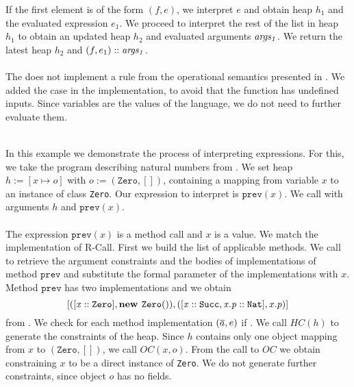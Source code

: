 If the first element is of the form $(f, e)$,
we interpret $e$ and obtain heap $h_1$ and the evaluated expression $e_1$.
We proceed to interpret the rest of the list in heap $h_1$
to obtain an updated heap $h_2$ and evaluated arguments $\mathit{args_1}$.
We return the latest heap $h_2$ and $(f, e_1) :: \mathit{args_1}$.\\
\\
The  does not implement
a rule from the operational semantics presented in .
We added the case in the implementation,
to avoid that the function has undefined inputs.
Since variables are the values of the language,
we do not need to further evaluate them.
%
\begin{example}\quad\\
In this example we demonstrate the process of interpreting expressions.
For this, we take the program describing natural numbers from .
We set heap $h := [x \mapsto o]$ with $o := (\texttt{Zero}, [])$, containing
a mapping from variable $x$ to an instance of class \texttt{Zero}.
Our expression to interpret is $\texttt{prev}(x)$.
We call  with arguments $h$ and $\texttt{prev}(x)$.\\
\\
The expression $\texttt{prev}(x)$ is a method call and
$x$ is a value.
We match the implementation of R-Call.
First we build the list of applicable methods.
We call  to retrieve
the argument constraints and the bodies of
implementations of method $\texttt{prev}$
and substitute the formal parameter
of the implementations with $x$.
Method $\texttt{prev}$ has two implementations
and we obtain
\[ [([\mathit{x} :: \mathit{\texttt{Zero}}], \textbf{new } \mathit{\texttt{Zero}}()),
    ([\mathit{x} :: \mathit{\texttt{Succ}}, \mathit{x.p} :: \mathit{\texttt{Nat}}], x.p)] \]
from .
We check for each method implementation $(\overline{a}, e)$
if .
We call $HC(h)$ to generate the constraints of the heap.
Since $h$ contains only one object mapping from $x$ to $(\texttt{Zero}, [])$,
we call $OC(x, o)$.
From the call to $OC$ we obtain 
constraining $x$ to be a direct instance of \texttt{Zero}.
We do not generate further constraints, since object $o$ has no fields.


\end{example}
